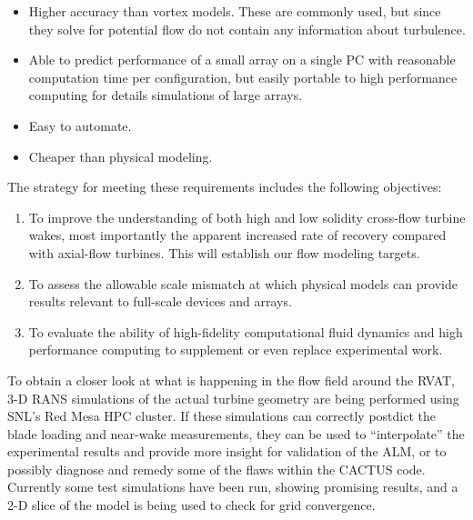 \begin{itemize}
    
    \item Higher accuracy than vortex models. These are commonly used, but since
    they solve for potential flow do not contain any information about
    turbulence.
    
    \item Able to predict performance of a small array on a single PC with reasonable computation time per configuration, but easily portable to high performance computing for details simulations of large arrays.
    
    \item Easy to automate. 
    
    \item Cheaper than physical modeling. 
    
\end{itemize}


The strategy for meeting these requirements includes the following objectives:

\begin{enumerate}

	\item To improve the understanding of both high and low solidity cross-flow
    turbine wakes, most importantly the apparent increased rate of recovery
    compared with axial-flow turbines. This will establish our flow modeling
    targets.
	
	\item To assess the allowable scale mismatch at which physical models can
	provide results relevant to full-scale devices and arrays.
	
	\item To evaluate the ability of high-fidelity computational fluid dynamics and
	high performance computing to supplement or even replace experimental work.

\end{enumerate}

To obtain a closer look at what is happening in the flow field around the RVAT,
3-D RANS simulations of the actual turbine geometry are being performed using
SNL's Red Mesa HPC cluster. If these simulations can correctly postdict the
blade loading and near-wake measurements, they can be used to ``interpolate''
the experimental results and provide more insight for validation of the ALM, or
to possibly diagnose and remedy some of the flaws within the CACTUS code.
Currently some test simulations have been run, showing promising results, and a
2-D slice of the model is being used to check for grid convergence.

